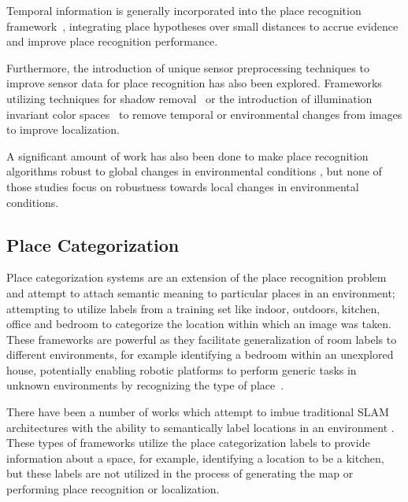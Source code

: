 \documentclass[letterpaper, 10 pt, conference]{ieeeconf}  %
\begin{document}
Temporal information is generally incorporated into the place recognition framework~\cite{Milford2012}, integrating place hypotheses over small distances to accrue evidence and improve place recognition performance.

Furthermore, the introduction of unique sensor preprocessing techniques to improve sensor data for place recognition has also been explored. Frameworks utilizing techniques for shadow removal~\cite{corke2013dealing} or the introduction of illumination invariant color spaces~\cite{mcmanus2014shady} to remove temporal or environmental changes from images to improve localization. 

A significant amount of work has also been done to make place recognition algorithms robust to global changes in environmental conditions \cite{Maddern,McManus2015}, but none of those studies focus on robustness towards local changes in environmental conditions.


\subsection{Place Categorization}

Place categorization systems are an extension of the place recognition problem and attempt to attach semantic meaning to particular places in an environment; attempting to utilize labels from a training set like indoor, outdoors, kitchen, office and bedroom to categorize the location within which an image was taken. These frameworks are powerful as they facilitate generalization of room labels to different environments, for example identifying a bedroom within an unexplored house, potentially enabling robotic platforms to perform generic tasks in unknown environments by recognizing the type of place~\cite{wu2009visual}. 

There have been a number of works which attempt to imbue traditional SLAM architectures with the ability to semantically label locations in an environment \cite{sunderhauf2016place}. These types of frameworks utilize the place categorization labels to provide information about a space, for example, identifying a location to be a kitchen, but these labels are not utilized in the process of generating the map or performing place recognition or localization. 
\end{document}
